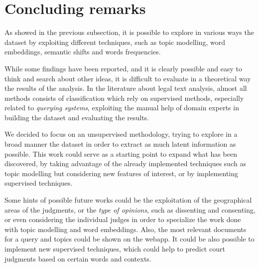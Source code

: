\section{Concluding remarks}
As showed in the previous subsection, it is possible to explore
in various ways the dataset by exploiting different techniques, such as topic modelling, word embeddings, semantic
shifts and words frequencies.

While some findings have been reported, and it is clearly possible and easy to think and search about other ideas,
it is difficult to evaluate in a theoretical way the results of the analysis. In the literature about
legal text analysis, almost all methods consists of classification which rely on supervised methods, 
especially related to \emph{querying systems}, exploiting the manual help of domain experts in building the dataset 
and evaluating the results.~\cite{caselaw_query}

We decided to focus on an unsupervised methodology, trying to explore in a broad manner the dataset in order to
extract as much latent information as possible. This work could serve as a starting point to expand what has been
discovered, by taking advantage of the already implemented techniques such as topic modelling but considering new
features of interest, or by implementing supervised techniques.

Some hints of possible future works could be the exploitation of the geographical areas of the judgments,
or the \emph{type of
opinions}, such as dissenting and consenting, or even considering the individual judges in order to specialize
the work done with topic modelling and word embeddings. Also, the most relevant documents 
for a query and topics could be shown on the webapp. It could be also possible to 
implement new supervised techniques,
which could help to predict court judgments based on certain words and contexts.~\cite{argumentation_mining}